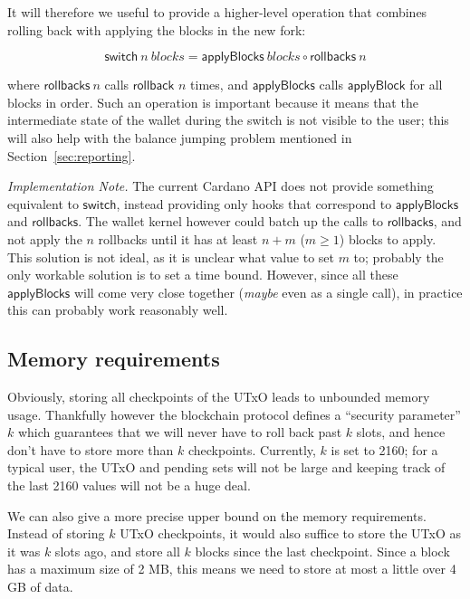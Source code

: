 \documentclass{article}
\begin{document}
It will therefore we useful to provide a higher-level operation that combines
rolling back with applying the blocks in the new fork:

\begin{equation}
\mathsf{switch} ~ n ~ \mathit{blocks} = \mathsf{applyBlocks} ~ \mathit{blocks} \circ \mathsf{rollbacks} ~ n
\end{equation}

where $\mathsf{rollbacks} ~ n$ calls $\mathsf{rollback}$ $n$ times, and
$\mathsf{applyBlocks}$ calls $\mathsf{applyBlock}$ for all blocks in order.
Such an operation is important because it means that the intermediate state
of the wallet during the switch is not visible to the user; this will also
help with the balance jumping problem mentioned in Section~\ref{sec:reporting}.

\emph{Implementation Note.} The current Cardano API does not provide something
equivalent to $\mathsf{switch}$, instead providing only hooks that correspond to
$\mathsf{applyBlocks}$ and $\mathsf{rollbacks}$. The wallet kernel however could
batch up the calls to $\mathsf{rollbacks}$, and not apply the $n$ rollbacks
until it has at least $n + m$ ($m \ge 1$) blocks to apply. This solution is not
ideal, as it is unclear what value to set $m$ to; probably the only workable
solution is to set a time bound. However, since all these $\mathsf{applyBlocks}$
will come very close together (\emph{maybe} even as a single call), in practice
this can probably work reasonably well.

\subsection{Memory requirements}

Obviously, storing all checkpoints of the UTxO leads to unbounded memory usage.
Thankfully however the blockchain protocol defines a ``security parameter'' $k$
which guarantees that we will never have to roll back past $k$ slots, and hence
don't have to store more than $k$ checkpoints. Currently, $k$ is set to 2160;
for a typical user, the UTxO and pending sets will not be large and keeping
track of the last 2160 values will not be a huge deal.


We can also give a more precise upper bound on the memory requirements. Instead
of storing $k$ UTxO checkpoints, it would also suffice to store the UTxO as it
was $k$ slots ago, and store all $k$ blocks since the last checkpoint. Since a
block has a maximum size of 2 MB, this means we need to store at most a little
over 4 GB of data.
\end{document}
